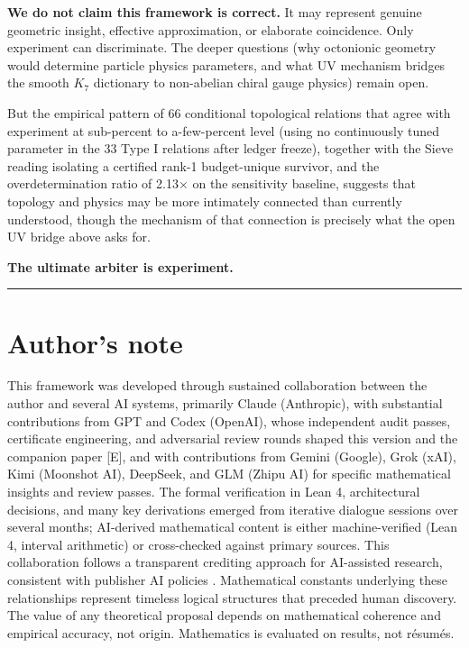 \documentclass[11pt,a4paper]{article}
\begin{document}
\textbf{We do not claim this framework is correct.} It may represent genuine geometric insight, effective approximation, or elaborate coincidence. Only experiment can discriminate. The deeper questions (why octonionic geometry would determine particle physics parameters, and what UV mechanism bridges the smooth \(K_7\) dictionary to non-abelian chiral gauge physics) remain open.

But the empirical pattern of 66 conditional topological relations that agree with experiment at sub-percent to a-few-percent level (using no continuously tuned parameter in the 33 Type I relations after ledger freeze), together with the Sieve reading isolating a certified rank-1 budget-unique survivor, and the overdetermination ratio of 2.13× on the sensitivity baseline, suggests that topology and physics may be more intimately connected than currently understood, though the mechanism of that connection is precisely what the open UV bridge above asks for.

\textbf{The ultimate arbiter is experiment.}

\begin{center}\rule{\linewidth}{0.5pt}\end{center}

\section{Author's note}\label{authors-note}

This framework was developed through sustained collaboration between the author and several AI systems, primarily Claude (Anthropic), with substantial contributions from GPT and Codex (OpenAI), whose independent audit passes, certificate engineering, and adversarial review rounds shaped this version and the companion paper {[}E{]}, and with contributions from Gemini (Google), Grok (xAI), Kimi (Moonshot AI), DeepSeek, and GLM (Zhipu AI) for specific mathematical insights and review passes. The formal verification in Lean 4, architectural decisions, and many key derivations emerged from iterative dialogue sessions over several months; AI-derived mathematical content is either machine-verified (Lean 4, interval arithmetic) or cross-checked against primary sources. This collaboration follows a transparent crediting approach for AI-assisted research, consistent with publisher AI policies \cite{38}. Mathematical constants underlying these relationships represent timeless logical structures that preceded human discovery. The value of any theoretical proposal depends on mathematical coherence and empirical accuracy, not origin. Mathematics is evaluated on results, not résumés.
\end{document}
